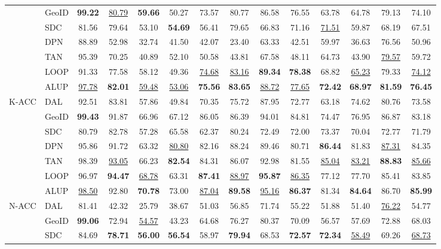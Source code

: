 \begin{tabular}{llcccccccccccc}
&GeoID&\textbf{99.22}&\underline{80.79}&\textbf{59.66}&50.27&73.57&80.77&86.58&76.55&63.78&64.78&79.13&74.10\\
&SDC&81.56&79.64&53.10&\textbf{54.69}&56.41&79.65&66.83&71.16&\underline{71.51}&59.87&68.19&67.51\\
&DPN&88.89&52.98&32.74&41.50&42.07&23.40&63.33&42.51&59.97&36.63&76.56&50.96\\
&TAN&95.39&70.25&40.89&52.10&50.58&43.81&67.58&48.11&64.73&43.90&\underline{79.57}&59.72\\
&LOOP&91.33&77.58&58.12&49.36&\underline{74.68}&\underline{83.16}&\textbf{89.34}&\textbf{78.38}&68.82&\underline{65.23}&79.33&\underline{74.12}\\
&ALUP&\underline{97.78}&\textbf{82.01}&\underline{59.48}&\underline{53.06}&\textbf{75.56}&\textbf{83.65}&\underline{88.72}&\underline{77.65}&\textbf{72.42}&\textbf{68.97}&\textbf{81.59}&\textbf{76.45}\\
\cline{1-14}
\multirow[t]{7}{*}{K-ACC}&DAL&92.51&83.81&57.86&49.84&70.35&75.72&87.95&72.77&63.18&74.62&80.76&73.58\\
&GeoID&\textbf{99.43}&91.87&66.96&67.12&86.05&86.39&94.01&84.81&74.47&76.95&86.87&83.18\\
&SDC&80.79&82.78&57.28&65.58&62.37&80.24&72.49&72.00&73.37&70.04&72.77&71.79\\
&DPN&95.86&91.72&63.32&\underline{80.80}&82.16&88.24&89.46&80.71&\textbf{86.44}&81.83&\underline{87.31}&84.35\\
&TAN&98.39&\underline{93.05}&66.23&\textbf{82.54}&84.31&86.07&92.98&81.55&\underline{85.04}&\underline{83.21}&\textbf{88.83}&\underline{85.66}\\
&LOOP&96.97&\textbf{94.47}&\underline{68.78}&63.31&\textbf{87.41}&\underline{88.97}&\textbf{95.87}&\underline{86.35}&77.12&77.70&85.41&83.85\\
&ALUP&\underline{98.50}&92.80&\textbf{70.78}&73.00&\underline{87.04}&\textbf{89.58}&\underline{95.16}&\textbf{86.37}&81.34&\textbf{84.64}&86.70&\textbf{85.99}\\
\cline{1-14}
\multirow[t]{7}{*}{N-ACC}&DAL&81.41&42.32&25.79&38.67&51.03&56.85&71.74&55.22&51.88&51.40&\underline{76.22}&54.77\\
&GeoID&\textbf{99.06}&72.94&\underline{54.57}&43.23&64.68&76.27&80.37&70.09&56.57&57.69&72.88&68.03\\
&SDC&84.69&\textbf{78.71}&\textbf{56.00}&\textbf{56.54}&58.97&\textbf{79.94}&68.53&\textbf{72.57}&\textbf{72.34}&\underline{58.49}&69.26&\underline{68.73}\\

\end{tabular}
